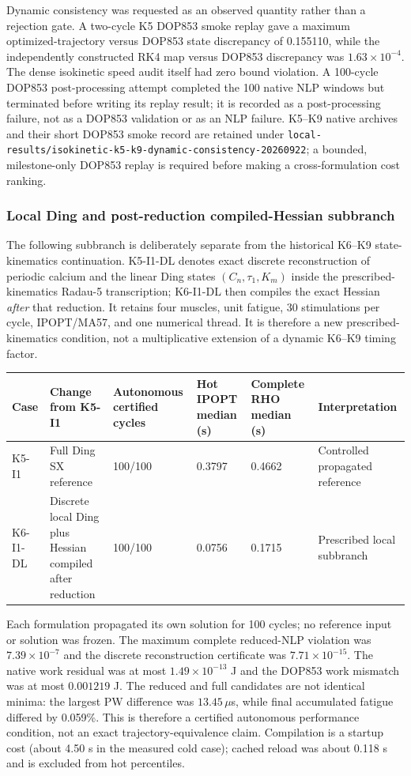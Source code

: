 \documentclass[10pt]{article}
\begin{document}
Dynamic consistency was requested as an observed quantity rather than a rejection gate. A two-cycle K5 DOP853 smoke replay gave a maximum optimized-trajectory versus DOP853 state discrepancy of 0.155110, while the independently constructed RK4 map versus DOP853 discrepancy was $1.63\times10^{-4}$. The dense isokinetic speed audit itself had zero bound violation. A 100-cycle DOP853 post-processing attempt completed the 100 native NLP windows but terminated before writing its replay result; it is recorded as a post-processing failure, not as a DOP853 validation or as an NLP failure. K5--K9 native archives and their short DOP853 smoke record are retained under \texttt{local-results/isokinetic-k5-k9-dynamic-consistency-20260922}; a bounded, milestone-only DOP853 replay is required before making a cross-formulation cost ranking.

\subsubsection{Local Ding and post-reduction compiled-Hessian subbranch}

The following subbranch is deliberately separate from the historical K6--K9 state-kinematics continuation. K5-I1-DL denotes exact discrete reconstruction of periodic calcium and the linear Ding states $(C_n,\tau_1,K_m)$ inside the prescribed-kinematics Radau-5 transcription; K6-I1-DL then compiles the exact Hessian \emph{after} that reduction. It retains four muscles, unit fatigue, 30 stimulations per cycle, IPOPT/MA57, and one numerical thread. It is therefore a new prescribed-kinematics condition, not a multiplicative extension of a dynamic K6--K9 timing factor.

\begin{longtable}{@{}p{}p{}p{}p{}p{}p{}@{}}
\toprule
Case & Change from K5-I1 & Autonomous certified cycles & Hot IPOPT median (s) & Complete RHO median (s) & Interpretation\\
\midrule
\endhead
K5-I1 & Full Ding SX reference & 100/100 & 0.3797 & 0.4662 & Controlled propagated reference\\
K6-I1-DL & Discrete local Ding plus Hessian compiled after reduction & 100/100 & 0.0756 & 0.1715 & Prescribed local subbranch\\
\bottomrule
\end{longtable}

Each formulation propagated its own solution for 100 cycles; no reference input or solution was frozen. The maximum complete reduced-NLP violation was $7.39\times10^{-7}$ and the discrete reconstruction certificate was $7.71\times10^{-15}$. The native work residual was at most $1.49\times10^{-13}$ J and the DOP853 work mismatch was at most $0.001219$ J. The reduced and full candidates are not identical minima: the largest PW difference was $13.45\,\mu$s, while final accumulated fatigue differed by 0.059\%. This is therefore a certified autonomous performance condition, not an exact trajectory-equivalence claim. Compilation is a startup cost (about 4.50 s in the measured cold case); cached reload was about 0.118 s and is excluded from hot percentiles.
\end{document}
